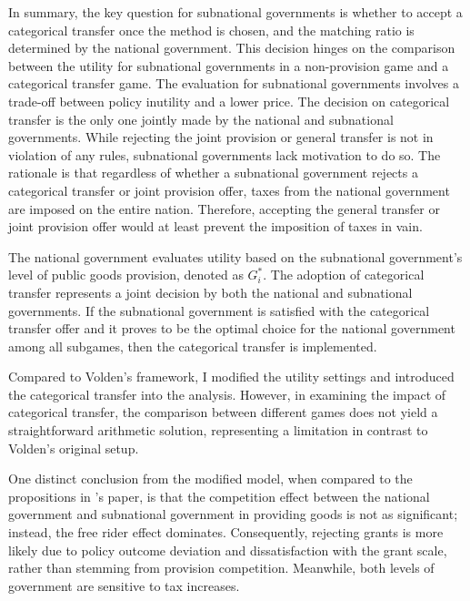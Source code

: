 In summary, the key question for subnational governments is whether to accept a categorical transfer once the method is chosen, and the matching ratio is determined by the national government. This decision hinges on the comparison between the utility for subnational governments in a non-provision game and a categorical transfer game. The evaluation for subnational governments involves a trade-off between policy inutility and a lower price. The decision on categorical transfer is the only one jointly made by the national and subnational governments. While rejecting the joint provision or general transfer is not in violation of any rules, subnational governments lack motivation to do so. The rationale is that regardless of whether a subnational government rejects a categorical transfer or joint provision offer, taxes from the national government are imposed on the entire nation. Therefore, accepting the general transfer or joint provision offer would at least prevent the imposition of taxes in vain. %

The national government evaluates utility based on the subnational government's level of public goods provision, denoted as $G_i^*$. The adoption of categorical transfer represents a joint decision by both the national and subnational governments. If the subnational government is satisfied with the categorical transfer offer and it proves to be the optimal choice for the national government among all subgames, then the categorical transfer is implemented.

Compared to Volden's framework, I modified the utility settings and introduced the categorical transfer into the analysis. However, in examining the impact of categorical transfer, the comparison between different games does not yield a straightforward arithmetic solution, representing a limitation in contrast to Volden's original setup.%

One distinct conclusion from the modified model, when compared to the propositions in \Textcite{volden2007intergovernmental}'s paper, is that the competition effect between the national government and subnational government in providing goods is not as significant; instead, the free rider effect dominates. Consequently, rejecting grants is more likely due to policy outcome deviation and dissatisfaction with the grant scale, rather than stemming from provision competition. Meanwhile, both levels of government are sensitive to tax increases.%

